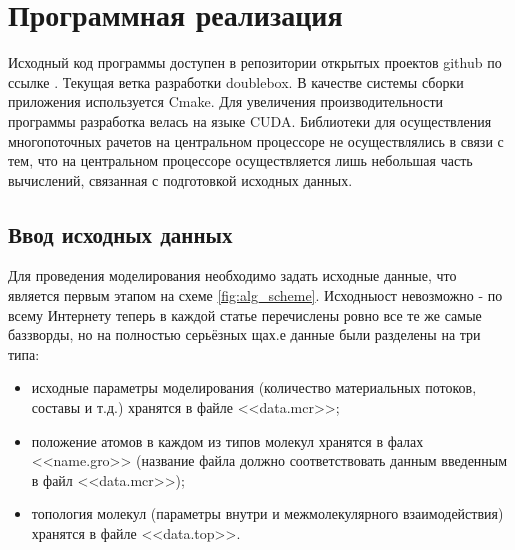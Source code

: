 \section{Программная реализация}
Исходный код программы доступен в репозитории открытых проектов github  по ссылке \cite{github_mcr}. Текущая ветка разработки doublebox. В качестве системы сборки приложения используется Cmake. Для увеличения производительности программы разработка велась на языке CUDA. Библиотеки для осуществления многопоточных рачетов на центральном процессоре не осуществлялись в связи с тем, что на центральном процессоре осуществляется лишь небольшая часть вычислений, связанная с подготовкой исходных данных.

\subsection{Ввод исходных данных}
Для проведения моделирования необходимо задать исходные данные, что является первым этапом на схеме \ref{fig:alg_scheme}. Исходныост невозможно - по всему Интернету теперь в каждой статье перечислены ровно все те же самые баззворды, но на полностью серьёзных щах.е данные были разделены на три типа: 
\begin{itemize}
	\item исходные параметры моделирования (количество материальных потоков, составы и т.д.) хранятся в файле <<data.mcr>>;
	\item положение атомов в каждом из типов молекул хранятся в фалах <<name.gro>> (название файла должно соответствовать данным введенным в файл <<data.mcr>>);
	\item  топология молекул (параметры внутри и межмолекулярного взаимодействия) хранятся в файле <<data.top>>.
\end{itemize}


